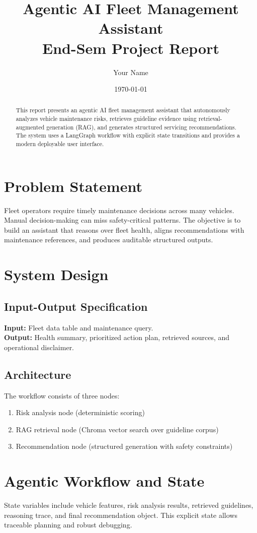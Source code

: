 \documentclass[12pt]{article}
\title{Agentic AI Fleet Management Assistant\\End-Sem Project Report}
\author{Your Name}
\date{\today}
\begin{document}
\maketitle

\begin{abstract}
This report presents an agentic AI fleet management assistant that autonomously analyzes vehicle maintenance risks, retrieves guideline evidence using retrieval-augmented generation (RAG), and generates structured servicing recommendations. The system uses a LangGraph workflow with explicit state transitions and provides a modern deployable user interface.
\end{abstract}

\section{Problem Statement}
Fleet operators require timely maintenance decisions across many vehicles. Manual decision-making can miss safety-critical patterns. The objective is to build an assistant that reasons over fleet health, aligns recommendations with maintenance references, and produces auditable structured outputs.

\section{System Design}
\subsection{Input-Output Specification}
\textbf{Input:} Fleet data table and maintenance query.\\
\textbf{Output:} Health summary, prioritized action plan, retrieved sources, and operational disclaimer.

\subsection{Architecture}
The workflow consists of three nodes:
\begin{enumerate}[noitemsep]
    \item Risk analysis node (deterministic scoring)
    \item RAG retrieval node (Chroma vector search over guideline corpus)
    \item Recommendation node (structured generation with safety constraints)
\end{enumerate}

\section{Agentic Workflow and State}
State variables include vehicle features, risk analysis results, retrieved guidelines, reasoning trace, and final recommendation object. This explicit state allows traceable planning and robust debugging.
\end{document}
